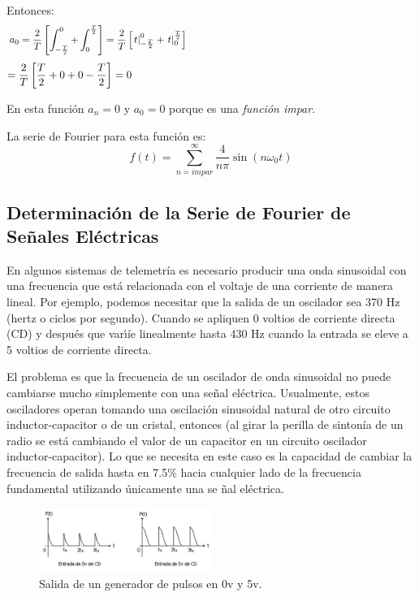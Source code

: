 \documentclass[a4paper]{article}
\begin{document}
{} Entonces:  
\[
a_0=\frac{2}{T}\left[\int_{-\frac{T}{2}}^{0}+\int_{0}^{\frac{T}{2}}\right]=%
\frac{2}{T}\left[\left.t\right|_{-\frac{T}{2}}^{0}+  \left.t\right|_{0}^{%
\frac{T}{2}}\right] \hspace{8cm}
\]
\[
= \frac{2}{T}\left[\frac{T}{2}+0+0-\frac{T}{2}\right]=0 \hspace{9.3cm}
\]

{} En esta funci\'on $a_{n}=0$ y $a_{0}=0$ porque es una \textit{funci\'on
impar}.\newline

{} La serie de Fourier para esta funci\'on es:  
\[
f(t)=\sum_{n=impar}^{\infty}\frac{4}{n\pi}\sin\left(n\omega_{0}t\right)
\]


\subsection{Determinaci\'on de la Serie de Fourier de Se\~nales El\'ectricas}

{} En algunos sistemas de telemetr\'ia es necesario producir una onda
sinusoidal con una frecuencia que est\'a relacionada con el voltaje de una
corriente de manera lineal. Por ejemplo, podemos necesitar que la salida de
un oscilador sea 370 Hz (hertz o ciclos por segundo). Cuando se apliquen 0
voltios de corriente directa (CD) y despu\'es que var\'{\i}\'ie linealmente
hasta 430 Hz cuando la entrada se eleve a 5 voltios de corriente directa. 

{} El problema es que la frecuencia de un oscilador de onda sinusoidal no
puede cambiarse mucho simplemente con una se\~{n}al el\'ectrica. Usualmente,
estos osciladores operan tomando una oscilaci\'on sinusoidal natural de otro
circuito inductor-capacitor o de un cristal, entonces (al girar la perilla
de sinton\'ia de un radio se est\'a cambiando el valor de un capacitor en un
circuito oscilador inductor-capacitor). Lo que se necesita en este caso es
la capacidad de cambiar la frecuencia de salida hasta en 7.5\% hacia
cualquier lado de la frecuencia fundamental utilizando \'unicamente una se%
\~{n}al el\'ectrica.

\begin{figure}[h]
\centering
\includegraphics[width=0.50\textwidth]{senal.jpg}   
\caption{Salida de un generador de pulsos en 0v y 5v.}
\label{fig:senal}
\end{figure}
\end{document}
